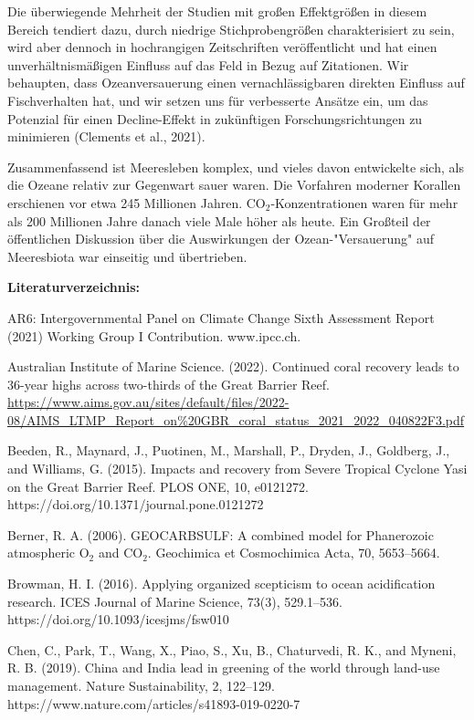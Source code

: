 \documentclass[12pt,paper=a4,DIV=12,parskip=never,chapterprefix=false,headings=standardclasses]{scrreprt}
\begin{document}
Die überwiegende Mehrheit der Studien mit großen Effektgrößen in diesem Bereich tendiert dazu, durch niedrige Stichprobengrößen charakterisiert zu sein, wird aber dennoch in hochrangigen Zeitschriften veröffentlicht und hat einen unverhältnismäßigen Einfluss auf das Feld in Bezug auf Zitationen. Wir behaupten, dass Ozeanversauerung einen vernachlässigbaren direkten Einfluss auf Fischverhalten hat, und wir setzen uns für verbesserte Ansätze ein, um das Potenzial für einen Decline-Effekt in zukünftigen Forschungsrichtungen zu minimieren (Clements et al., 2021).

Zusammenfassend ist Meeresleben komplex, und vieles davon entwickelte sich, als die Ozeane relativ zur Gegenwart sauer waren. Die Vorfahren moderner Korallen erschienen vor etwa 245 Millionen Jahren. CO$_2$-Konzentrationen waren für mehr als 200 Millionen Jahre danach viele Male höher als heute. Ein Großteil der öffentlichen Diskussion über die Auswirkungen der Ozean-"Versauerung" auf Meeresbiota war einseitig und übertrieben.

\vfill
\noindent\textbf{Literaturverzeichnis:}

\begingroup
\parindent=0pt
\everypar{\hangindent=2em\hangafter=1\relax}

AR6: Intergovernmental Panel on Climate Change Sixth Assessment Report (2021) Working Group I Contribution. www.ipcc.ch.

Australian Institute of Marine Science. (2022). Continued coral recovery leads to 36-year highs across two-thirds of the Great Barrier Reef. \url{https://www.aims.gov.au/sites/default/files/2022-08/AIMS_LTMP_Report_on\%20GBR_coral_status_2021_2022_040822F3.pdf}

Beeden, R., Maynard, J., Puotinen, M., Marshall, P., Dryden, J., Goldberg, J., and Williams, G. (2015). Impacts and recovery from Severe Tropical Cyclone Yasi on the Great Barrier Reef. PLOS ONE, 10, e0121272. https://doi.org/10.1371/journal.pone.0121272

Berner, R. A. (2006). GEOCARBSULF: A combined model for Phanerozoic atmospheric O$_2$ and CO$_2$. Geochimica et Cosmochimica Acta, 70, 5653–5664.

Browman, H. I. (2016). Applying organized scepticism to ocean acidification research. ICES Journal of Marine Science, 73(3), 529.1–536. https://doi.org/10.1093/icesjms/fsw010

Chen, C., Park, T., Wang, X., Piao, S., Xu, B., Chaturvedi, R. K., and Myneni, R. B. (2019). China and India lead in greening of the world through land-use management. Nature Sustainability, 2, 122–129. https://www.nature.com/articles/s41893-019-0220-7
\end{document}
